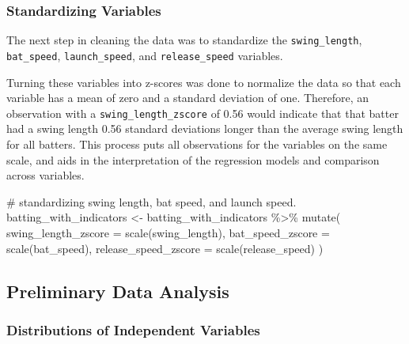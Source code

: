 \documentclass[
  letterpaper,
  DIV=11,
  numbers=noendperiod]{scrartcl}
\newenvironment{Shaded}{\begin{snugshade}}{\end{snugshade}}
\newcommand{\AttributeTok}[1]{\textcolor[rgb]{0.40,0.45,0.13}{#1}}
\newcommand{\CommentTok}[1]{\textcolor[rgb]{0.37,0.37,0.37}{#1}}
\newcommand{\FunctionTok}[1]{\textcolor[rgb]{0.28,0.35,0.67}{#1}}
\newcommand{\NormalTok}[1]{\textcolor[rgb]{0.00,0.23,0.31}{#1}}
\newcommand{\OtherTok}[1]{\textcolor[rgb]{0.00,0.23,0.31}{#1}}
\newcommand{\SpecialCharTok}[1]{\textcolor[rgb]{0.37,0.37,0.37}{#1}}
\begin{document}
\subsubsection{Standardizing Variables}\label{standardizing-variables}

The next step in cleaning the data was to standardize the
\texttt{swing\_length}, \texttt{bat\_speed}, \texttt{launch\_speed}, and
\texttt{release\_speed} variables.

Turning these variables into z-scores was done to normalize the data so
that each variable has a mean of zero and a standard deviation of one.
Therefore, an observation with a \texttt{swing\_length\_zscore} of 0.56
would indicate that that batter had a swing length 0.56 standard
deviations longer than the average swing length for all batters. This
process puts all observations for the variables on the same scale, and
aids in the interpretation of the regression models and comparison
across variables.

\begin{Shaded}
\begin{Highlighting}[]
\CommentTok{\# standardizing swing length, bat speed, and launch speed. }
\NormalTok{batting\_with\_indicators }\OtherTok{\textless{}{-}}\NormalTok{ batting\_with\_indicators }\SpecialCharTok{\%\textgreater{}\%}
  \FunctionTok{mutate}\NormalTok{(}
    \AttributeTok{swing\_length\_zscore =} \FunctionTok{scale}\NormalTok{(swing\_length),}
    \AttributeTok{bat\_speed\_zscore =} \FunctionTok{scale}\NormalTok{(bat\_speed),}
    \AttributeTok{release\_speed\_zscore =} \FunctionTok{scale}\NormalTok{(release\_speed)}
\NormalTok{  )}
\end{Highlighting}
\end{Shaded}

\subsection{Preliminary Data Analysis}\label{preliminary-data-analysis}

\subsubsection{Distributions of Independent
Variables}\label{distributions-of-independent-variables}
\end{document}
